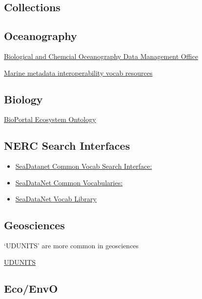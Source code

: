\documentclass[]{book}
\begin{document}
\hypertarget{collections}{%
\subsection{Collections}\label{collections}}

\hypertarget{oceanography}{%
\subsection{Oceanography}\label{oceanography}}

\href{http://www.bco-dmo.org/}{Biological and Chemcial Oceanography Data Management Office}

\href{https://mmisw.org/ont/\#/}{Marine metadata interoperability vocab resources}

\hypertarget{biology}{%
\subsection{Biology}\label{biology}}

\href{http://bioportal.bioontology.org/ontologies/ECSO}{BioPortal Ecosystem Ontology}

\hypertarget{nerc-search-interfaces}{%
\subsection{NERC Search Interfaces}\label{nerc-search-interfaces}}

\begin{itemize}
\item
  \href{http://seadatanet.maris2.nl/v_bodc_vocab_v2/welcome.asp}{SeaDatanet Common Vocab Search Interface:}
\item
  \href{https://www.seadatanet.org/Standards/Common-Vocabularies/}{SeaDataNet Common Vocabularies:}
\item
  \href{http://seadatanet.maris2.nl/v_bodc_vocab_v2/vocab_relations.asp?lib=P08}{SeaDataNet Vocab Library}
\end{itemize}

\hypertarget{geosciences}{%
\subsection{Geosciences}\label{geosciences}}

`UDUNITS' are more common in geosciences

\href{https://www.unidata.ucar.edu/software/udunits/}{UDUNITS}

\hypertarget{ecoenvo}{%
\subsection{Eco/EnvO}\label{ecoenvo}}
\end{document}
